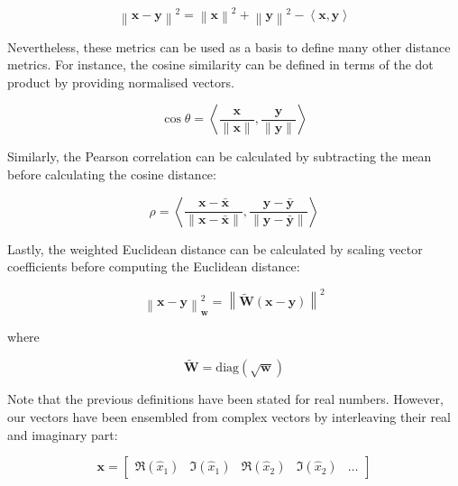 \documentclass[../main.tex]{subfiles}
\begin{document}
\begin{equation}\label{eq:4:dot_l2}
    \left\lVert \bm{x} - \bm{y} \right\rVert^2 =
    \left\lVert \bm{x} \right\rVert^2 + \left\lVert \bm{y} \right\rVert^2 - \left\langle \bm{x},\bm{y} \right\rangle
\end{equation}

Nevertheless, these metrics can be used as a basis to define many other distance metrics. For instance, the cosine similarity can be defined in terms of the dot product by providing normalised vectors.

\begin{equation}\label{eq:4:cos}
    \cos \theta = \left\langle \frac{\bm{x}}{\lVert \bm{x} \rVert} , \frac{\bm{y}}{\lVert \bm{y} \rVert} \right\rangle
\end{equation}

Similarly, the Pearson correlation can be calculated by subtracting the mean before calculating the cosine distance:

\begin{equation}\label{eq:4:pearson}
    \rho = \left\langle \frac{\bm{x} - \bm{\bar{x}}}{\lVert \bm{x} - \bm{\bar{x}} \rVert} , \frac{\bm{y - \bm{\bar{y}}}}{\lVert \bm{y} - \bm{\bar{y}} \rVert} \right\rangle
\end{equation}

Lastly, the weighted Euclidean distance can be calculated by scaling vector coefficients before computing the Euclidean distance:

\begin{equation}\label{eq:4:l2_w}
    \left\lVert \bm{x} - \bm{y} \right\rVert^2_{\bm{w}} = \left\lVert \bm{\tilde{W}}(\bm{x} - \bm{y}) \right\rVert^2
\end{equation}

where 

\begin{equation}
    \bm{\tilde{W}} = \text{diag}(\sqrt{\bm{w}})
\end{equation}

Note that the previous definitions have been stated for real numbers. However, our vectors have been ensembled from complex vectors by interleaving their real and imaginary part:

\begin{equation}
    \bm{x} = 
    \begin{bmatrix}
        \Re(\hat{x}_1) & \Im(\hat{x}_1) & \Re(\hat{x}_2) & \Im(\hat{x}_2) & \dots  
    \end{bmatrix}
\end{equation}
\end{document}
